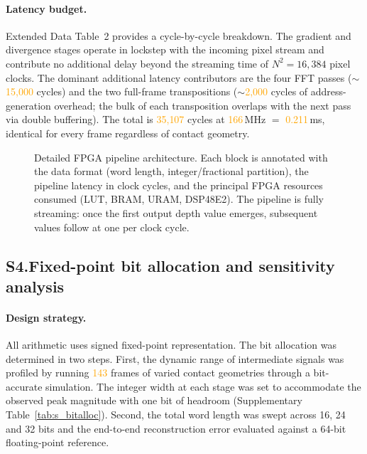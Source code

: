 \documentclass[10pt,a4paper]{article}
\newcommand{\placeholder}[1]{\textcolor{orange}{#1}}
\newcommand{\clockMHz}{\placeholder{166}}
\newcommand{\totalCyc}{\placeholder{35{,}107}}
\begin{document}
\paragraph{Latency budget.}
Extended Data Table~2 provides a cycle-by-cycle breakdown. The gradient and divergence stages operate in lockstep with the incoming pixel stream and contribute no additional delay beyond the streaming time of $N^2 = 16{,}384$ pixel clocks. The dominant additional latency contributors are the four FFT passes ($\sim$\placeholder{15{,}000} cycles) and the two full-frame transpositions ($\sim$\placeholder{2{,}000} cycles of address-generation overhead; the bulk of each transposition overlaps with the next pass via double buffering). The total is \totalCyc{} cycles at \clockMHz\,MHz $=$ \placeholder{0.211}\,ms, identical for every frame regardless of contact geometry.

\begin{figure}[h]
\centering
{}
\caption{Detailed FPGA pipeline architecture. Each block is annotated with the data format (word length, integer/fractional partition), the pipeline latency in clock cycles, and the principal FPGA resources consumed (LUT, BRAM, URAM, DSP48E2). The pipeline is fully streaming: once the first output depth value emerges, subsequent values follow at one per clock cycle.}
\label{fig:s_pipeline}
\end{figure}


\subsection*{S4.\quad Fixed-point bit allocation and sensitivity analysis}

\paragraph{Design strategy.}
All arithmetic uses signed fixed-point representation. The bit allocation was determined in two steps. First, the dynamic range of intermediate signals was profiled by running \placeholder{143} frames of varied contact geometries through a bit-accurate simulation. The integer width at each stage was set to accommodate the observed peak magnitude with one bit of headroom (Supplementary Table~\ref{tab:s_bitalloc}). Second, the total word length was swept across 16, 24 and 32 bits and the end-to-end reconstruction error evaluated against a 64-bit floating-point reference.
\end{document}
